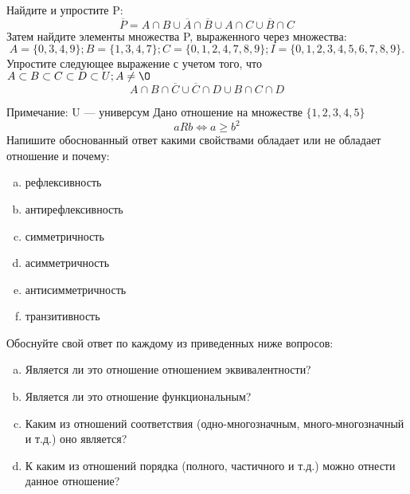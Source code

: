 \documentclass[10pt]{exam}
\begin{document}
\begin{questions}
\question
Найдите и упростите P:
\begin{equation*}
\overline{P} = A \cap B \cup \overline{A} \cap \overline{B} \cup A \cap C \cup \overline{B} \cap C
\end{equation*}
Затем найдите элементы множества P, выраженного через множества:
\begin{equation*}
A = \{0, 3, 4, 9\}; 
B = \{1, 3, 4, 7\};
C = \{0, 1, 2, 4, 7, 8, 9\};
I = \{0, 1, 2, 3, 4, 5, 6, 7, 8, 9\}.
\end{equation*}\question
Упростите следующее выражение с учетом того, что $A\subset B \subset C \subset D \subset U; A \neq \O$
\begin{equation*}
A \cap B  \cap \overline{C} \cup \overline{C} \cap D \cup B \cap C \cap D
\end{equation*}

Примечание: U — универсум\question
Дано отношение на множестве $\{1, 2, 3, 4, 5\}$ 
\begin{equation*}
aRb \iff a \geq b^2
\end{equation*}
Напишите обоснованный ответ какими свойствами обладает или не обладает отношение и почему:   
\begin{enumerate} [a)]\setcounter{enumi}{0}
\item рефлексивность
\item антирефлексивность
\item симметричность
\item асимметричность
\item антисимметричность
\item транзитивность
\end{enumerate}

Обоснуйте свой ответ по каждому из приведенных ниже вопросов:
\begin{enumerate} [a)]\setcounter{enumi}{0}
    \item Является ли это отношение отношением эквивалентности?
    \item Является ли это отношение функциональным?
    \item Каким из отношений соответствия (одно-многозначным, много-многозначный и т.д.) оно является?
    \item К каким из отношений порядка (полного, частичного и т.д.) можно отнести данное отношение?
\end{enumerate}



\end{questions}
\end{document}
